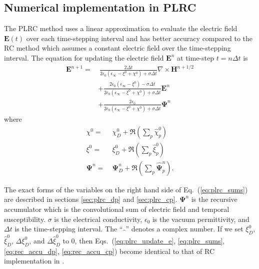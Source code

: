 \subsection{Numerical implementation in PLRC}
\label{sec:impl_plrc}
The PLRC method uses a linear approximation to evaluate the electric field $\mathbf{E}(t)$ over each time-stepping interval \cite{kelley_piecewise_1996} and has better accuracy compared to the RC method which assumes a constant electric field over the time-stepping interval. The equation for updating the electric field $\mathbf{E}^{n}$ at time-step $t=n\Delta t$ is
\begin{equation}
\begin{split}
\mathbf{E}^{n+1} = & ~ \frac{2 \Delta t}{2 \epsilon_0 \left( \epsilon_\infty - \xi^0 + \chi^0 \right) + \sigma \Delta t} \nabla \times \mathbf{H}^{n+1/2}\\
& + \frac{2 \epsilon_0 \left( \epsilon_\infty - \xi^0 \right) - \sigma \Delta t}{2 \epsilon_0 \left( \epsilon_\infty - \xi^0 + \chi^0 \right) + \sigma \Delta t} \mathbf{E}^n\\
& + \frac{2 \epsilon_0}{2 \epsilon_0 \left( \epsilon_\infty - \xi^0 + \chi^0 \right) + \sigma \Delta t} \mathbf{\Psi}^n
\end{split}
\label{eq:plrc_update_e}
\end{equation}
where
\begin{equation}
\begin{split}
\chi^0 = & ~ \chi_D^0 + \Re \left ( \sum_p \hat \chi_p^0 \right)\\
\xi^0 = & ~ \xi_D^0 + \Re \left ( \sum_p \hat \xi_p^0 \right )\\
\mathbf \Psi^n = & ~ \mathbf \Psi_D^n + \Re \left ( \sum_p \hat{\mathbf \Psi}_p^n \right ).
\label{eq:plrc_sums}
\end{split}
\end{equation}

The exact forms of the variables on the right hand side of Eq.~(\ref{eq:plrc_sums}) are described in sections \ref{sec:plrc_dp} and \ref{sec:plrc_cp}. $\mathbf{\Psi}^n$ is the recursive accumulator which is the convolutional sum of electric field and temporal susceptibility. $\sigma$ is the electrical conductivity, $\epsilon_0$ is the vacuum permittivity, and $\Delta t$ is the time-stepping interval. The ``$\hat{~~}$'' denotes a complex number. If we set $\xi_D^0$, $\hat \xi_D^0$, $\Delta \xi_D^0$, and $\Delta \hat \xi_D^0$ to 0, then Eqs.~(\ref{eq:plrc_update_e}, \ref{eq:plrc_sums}, \ref{eq:rec_accu_dp}, \ref{eq:rec_accu_cp}) become identical to that of RC implementation in \citet{vial_implementation_2007}.

